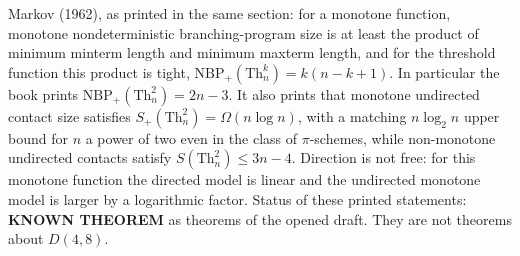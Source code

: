 \documentclass[11pt]{article}
\begin{document}
Markov (1962), as printed in the same section: for a monotone function, monotone nondeterministic branching-program size is at least the product of minimum minterm length and minimum maxterm length, and for the threshold function this product is tight, \(\mathrm{NBP}_+(\mathrm{Th}_n^k)=k(n-k+1)\).
In particular the book prints \(\mathrm{NBP}_+(\mathrm{Th}_n^2)=2n-3\).
It also prints that monotone undirected contact size satisfies \(S_+(\mathrm{Th}_n^2)=\Omega(n\log n)\), with a matching \(n\log_2 n\) upper bound for \(n\) a power of two even in the class of \(\pi\)-schemes, while non-monotone undirected contacts satisfy \(S(\mathrm{Th}_n^2)\le 3n-4\).
Direction is not free: for this monotone function the directed model is linear and the undirected monotone model is larger by a logarithmic factor.
Status of these printed statements: \textbf{KNOWN THEOREM} as theorems of the opened draft.
They are not theorems about \(D(4,8)\).
\end{document}
